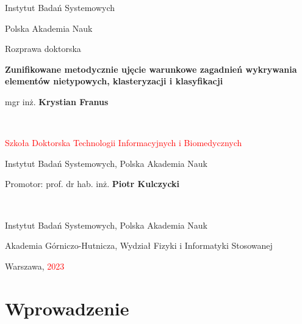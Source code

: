 \documentclass[12pt,a4paper,oneside]{book}
\theoremstyle{definition}
\begin{document}

\begin{titlepage}

\centering
Instytut Badań Systemowych

Polska Akademia Nauk

\vspace{2cm}
Rozprawa doktorska

\vspace{3cm}
{\Large \textbf{Zunifikowane metodycznie ujęcie warunkowe zagadnień wykrywania elementów nietypowych, klasteryzacji i klasyfikacji}}

\vspace{2cm}
{\large mgr inż. \textbf{Krystian Franus}}
\par~\par
\textcolor{red}{Szkoła Doktorska Technologii Informacyjnych i Biomedycznych}

Instytut Badań Systemowych, Polska Akademia Nauk

\vfill	
Promotor: prof. dr hab. inż. \textbf{Piotr Kulczycki}
\par~\par
Instytut Badań Systemowych, Polska Akademia Nauk

Akademia Górniczo-Hutnicza, Wydział Fizyki i Informatyki Stosowanej

\vfill
Warszawa, \textcolor{red}{2023}
\end{titlepage}


\tableofcontents
\setcounter{page}{2}  %



\chapter{Wprowadzenie}
\end{document}
